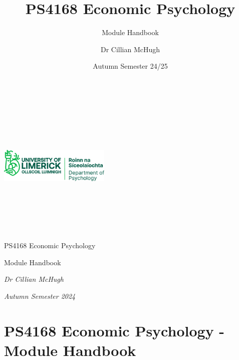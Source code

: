 \documentclass[
  x11names]{article}
\title{PS4168 Economic Psychology}
\subtitle{Module Handbook}
\author{Dr Cillian McHugh}
\date{Autumn Semester 24/25}
\begin{document}
\maketitle

\fancyhead{}
\fancyfoot{}
\fancyhead[LE,RO]{\thepage} 

~

~

~

\centering\includegraphics[width=2.08333in,height=\textheight]{"logos/department_logo.PNG"}

\raggedright

~

~

~

\renewcommand{\arraystretch}{1.5}

\begin{center}


\bigskip


\bigskip

\begin{huge} PS4168 Economic Psychology
\end{huge}

\begin{large} Module Handbook

\textit{Dr Cillian McHugh}

\textit{Autumn Semester 2024}
\end{large}
\end{center}

\pagebreak

\section{PS4168 Economic Psychology - Module
Handbook}\label{ps4168-economic-psychology---module-handbook}
\end{document}
